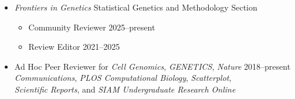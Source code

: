 \documentclass[margin]{res}
\begin{document}
\begin{resume}
\begin{itemize}
\begin{itemize}
		\end{itemize}
		
	\item \textit{Frontiers in Genetics} Statistical Genetics and Methodology Section
	  \begin{itemize}
	  \item Community Reviewer \hfill 2025--present
	  \item Review Editor \hfill 2021--2025
	  \end{itemize}
	
	\item Ad Hoc Peer Reviewer for \textit{Cell Genomics}, \textit{GENETICS},  \textit{Nature }  \hfill 2018--present \\ 
	\textit{Communications}, \textit{PLOS Computational Biology},  \textit{Scatterplot}, \\ 
	\textit{Scientific} \textit{Reports}, and \textit{SIAM Undergraduate Research Online} 
	\end{itemize}
	

\end{resume}
\end{document}
